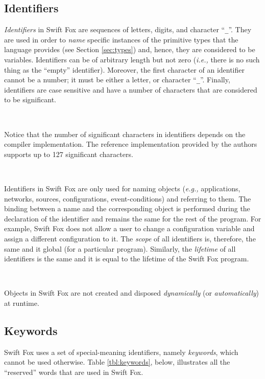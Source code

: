 \subsection{Identifiers}

\textit{Identifiers} in Swift Fox are sequences of letters, digits, and
character ``\texttt{\_}''. They are used in order to \textit{name} specific
instances of the primitive types that the language provides (see Section
\ref{sec:types}) and, hence, they are considered to be variables.
Identifiers can be of arbitrary length but not zero (\textit{i.e.,} there
is no such thing as the ``empty'' identifier). Moreover, the first
character of an identifier cannot be a number; it must be either a
letter, or character ``\texttt{\_}''. Finally, identifiers are case
sensitive and have a number of characters that are considered to be
significant.

\

\hangindent=4cm
\small
\noindent
Notice that the number of significant characters in identifiers depends on 
the compiler implementation. The reference implementation provided by the
authors supports up to 127 significant characters.
\normalsize

\

Identifiers in Swift Fox are only used for naming objects (\textit{e.g.,}
applications, networks, sources, configurations, event-conditions) and
referring to them. The binding between a name and the corresponding object
is performed during the declaration of the identifier and remains the same 
for the rest of the program. For example, Swift Fox does not allow a user 
to change a configuration variable and assign a different configuration 
to it. The \textit{scope} of all identifiers is, therefore, the same and
it global (for a particular program). Similarly, the \textit{lifetime} of 
all identifiers is the same and it is equal to the lifetime of the Swift 
Fox program. 

\

\hangindent=4cm
\small
\noindent
Objects in Swift Fox are not created and disposed \textit{dynamically} (or
\textit{automatically}) at runtime.
\normalsize

\subsection{Keywords}

Swift Fox uses a set of special-meaning identifiers, namely
\textit{keywords}, which cannot be used otherwise. Table
\ref{tbl:keywords}, below, illustrates all the ``reserved'' words that are 
used in Swift Fox.

